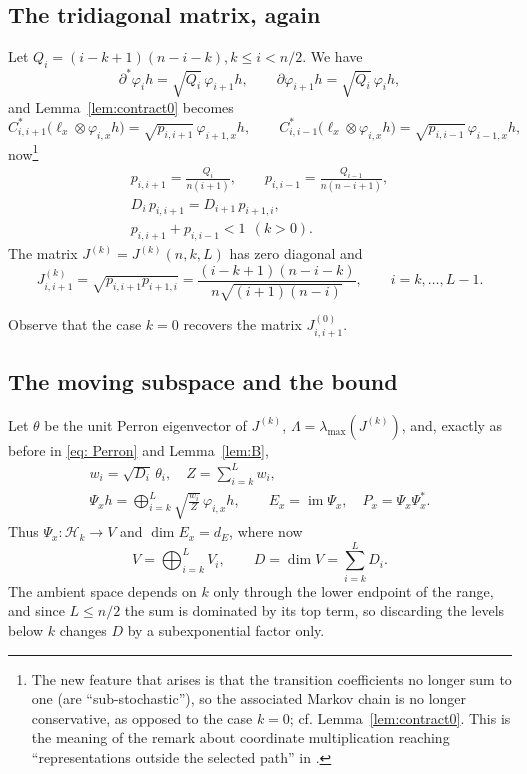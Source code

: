 \documentclass[11pt]{amsart}
\theoremstyle{plain}
\theoremstyle{remark}
\newcommand{\cH}{\mathcal H}
\newcommand{\lmax}{\lambda_{\max}}
\begin{document}
\subsection{The tridiagonal matrix, again}
Let $Q_i=(i-k+1)(n-i-k), k\le i<n/2$. We have
  $$
  \partial^{*}\varphi_ih=\sqrt{Q_i}\,\varphi_{i+1}h, \qquad
\partial\varphi_{i+1}h=\sqrt{Q_i}\,\varphi_ih,
$$
and Lemma~\ref{lem:contract0}
becomes
\[
 C^{*}_{i,i+1}\bigl(\ell_x\otimes\varphi_{i,x}h\bigr)=\sqrt{p_{i,i+1}}\,\varphi_{i+1,x}h,
 \qquad
 C^{*}_{i,i-1}\bigl(\ell_x\otimes\varphi_{i,x}h\bigr)=\sqrt{p_{i,i-1}}\,\varphi_{i-1,x}h,
\]
now\footnote{The new feature that arises is that the transition coefficients no longer sum to one (are ``sub-stochastic''), so the associated Markov chain is no longer conservative, as opposed to the case $k=0$; cf. Lemma~\ref{lem:contract0}. This is the meaning of the remark about coordinate multiplication reaching ``representations outside the selected path'' in \cite[Sec.2.1]{OAI26}.}
   \begin{gather}
 p_{i,i+1}=\frac{Q_i}{n(i+1)},\qquad
 p_{i,i-1}=\frac{Q_{i-1}}{n(n-i+1)},
 \\
 D_i\,p_{i,i+1}=D_{i+1}\,p_{i+1,i},
 \\
 p_{i,i+1}+p_{i,i-1}<1\ \ (k>0). \label{eq: nonstochastic}
 \end{gather}
The matrix $J^{(k)}=J^{(k)}(n,k,L)$ has zero diagonal and
\[
 J^{(k)}_{i,i+1}=\sqrt{p_{i,i+1}p_{i+1,i}}
 =\frac{(i-k+1)(n-i-k)}{n\sqrt{(i+1)(n-i)}},
 \qquad i=k,\dots,L-1 .
\]

\noindent Observe that the case $k=0$ recovers the matrix $J_{i,i+1}^{(0)}$. 

\subsection{The moving subspace and the bound}

Let $\theta$ be the unit Perron eigenvector of $J^{(k)}$, $\Lambda=\lmax(J^{(k)})$,
and, exactly as before in \eqref{eq: Perron} and Lemma~\ref{lem:B},
   \begin{gather}\nonumber
        w_i=\sqrt{D_i}\,\theta_i,\quad Z=\sum_{i=k}^{L}w_i,\\[-.1in]
 \Psi_xh=\bigoplus_{i=k}^{L}\sqrt{\tfrac{w_i}{Z}}\,\varphi_{i,x}h,
 \qquad
 E_x=\operatorname{im}\Psi_x,\quad P_x=\Psi_x\Psi_x^{*}. \label{eq: tower}
   \end{gather}
Thus $\Psi_x\colon\cH_k\to V$ and $\dim E_x=d_E$, where now
\begin{equation}\label{eq: V}
 V=\bigoplus_{i=k}^{L}V_i,\qquad D=\dim V=\sum_{i=k}^{L}D_i .
\end{equation}
The ambient space depends on $k$ only through the lower endpoint of the range,
and since $L\le n/2$ the sum is dominated by its top term, so discarding the
levels below $k$ changes $D$ by a subexponential factor only.
\end{document}

